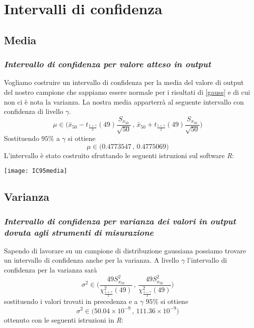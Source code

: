 \documentclass[a4paper]{article}
\begin{document}
	
	
	\section{Intervalli di confidenza}
	\medskip
	\subsection{Media}
	\subsubsection*{\textit{Intervallo di confidenza per valore atteso in output}}
	Vogliamo costruire un intervallo di confidenza per la media del valore di output del nostro campione che sappiamo essere normale per i risultati di \ref{gauss} e di cui non ci è nota la varianza. La nostra media apparterrà al seguente intervallo con confidenza di livello $\gamma$. \[\mu \in \biggl(\bar{x}_{50} - t_\frac{1+\gamma}{2}(49)\frac{S_{x_{50}}}{\sqrt{50}} \,,\, \bar{x}_{50} + t_\frac{1+\gamma}{2}(49)\frac{S_{x_{50}}}{\sqrt{50}} \biggr)\]
	Sostituendo $95\%$ a $\gamma$ si ottiene \[\mu \in \bigl(0.4773547 \,,\, 0.4775069\bigr)\] 
	L'intervallo è stato costruito sfruttando le seguenti istruzioni sul software \emph{R}:
	\begin{center}
		
		\texttt{[image: IC95media]} 

	\end{center}

\medskip
	
	\subsection{Varianza}
	\subsubsection*{\textit{Intervallo di confidenza per varianza dei valori in output dovuta agli strumenti di misurazione}}
	Sapendo di lavorare su un campione di distribuzione gaussiana possiamo trovare un intervallo di confidenza anche per la varianza. A livello $\gamma$ l'intervallo di confidenza per la varianza sarà \[\sigma^2 \in \Biggl(\frac{49 S_{x_{50}}^2}{\chi_\frac{1+\gamma}{2}^2(49)} \,,\, \frac{49 S_{x_{50}}^2}{\chi_\frac{1-\gamma}{2}^2(49)} \Biggr)\] sostituendo i valori trovati in precedenza e a $\gamma$ $95\%$ si ottiene \[\sigma^2 \in \bigl(50.04 \times 10^{-9} \,,\, 111.36 \times 10^{-9}\bigr)\] ottenuto con le seguenti istruzioni in \emph{R}: \\
	
\end{document}
